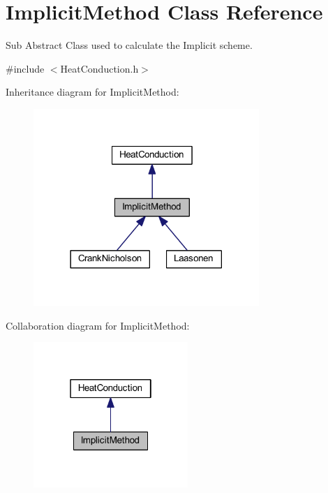 \hypertarget{class_implicit_method}{}\section{Implicit\+Method Class Reference}
\label{class_implicit_method}


Sub Abstract Class used to calculate the Implicit scheme.  




{\ttfamily \#include $<$Heat\+Conduction.\+h$>$}



Inheritance diagram for Implicit\+Method\+:\nopagebreak
\begin{figure}[H]
\begin{center}
\leavevmode
\includegraphics[width=242pt]{class_implicit_method__inherit__graph}
\end{center}
\end{figure}


Collaboration diagram for Implicit\+Method\+:\nopagebreak
\begin{figure}[H]
\begin{center}
\leavevmode
\includegraphics[width=166pt]{class_implicit_method__coll__graph}
\end{center}
\end{figure}

